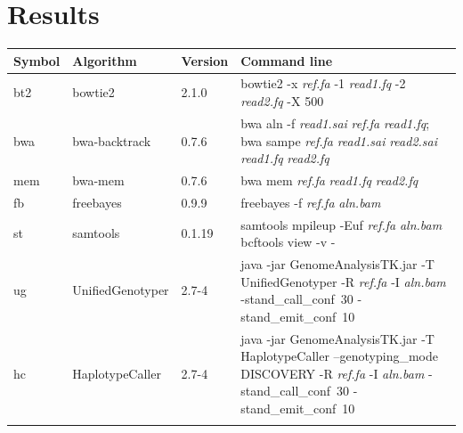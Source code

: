 \documentclass{bioinfo}
\begin{document}

\title{}

\author[Li]{Heng Li}

\address{Broad Institute of Harvard and MIT, 7 Cambridge Center, Cambridge, MA 02142, USA}

\maketitle

\begin{abstract}
\end{abstract}

\section{Results}

\begin{table}
\footnotesize
{}
{\begin{tabular*}{\textwidth}{@{\extracolsep{\fill}}lllp{12cm}}
\toprule
Symbol & Algorithm & Version & Command line \\
\midrule
bt2 & bowtie2 & 2.1.0 & bowtie2 -x \emph{ref.fa} -1 \emph{read1.fq} -2 \emph{read2.fq} -X 500 \\
bwa & bwa-backtrack & 0.7.6 & bwa aln -f \emph{read1.sai} \emph{ref.fa} \emph{read1.fq}; bwa sampe \emph{ref.fa} \emph{read1.sai} \emph{read2.sai} \emph{read1.fq} \emph{read2.fq} \\
mem & bwa-mem & 0.7.6 & bwa mem \emph{ref.fa} \emph{read1.fq} \emph{read2.fq} \\
fb & freebayes & 0.9.9 & freebayes -f \emph{ref.fa} \emph{aln.bam} \\
st & samtools & 0.1.19 & samtools mpileup -Euf \emph{ref.fa} \emph{aln.bam} {\tt \char124} bcftools view -v - \\
ug & UnifiedGenotyper & 2.7-4 & java -jar GenomeAnalysisTK.jar -T UnifiedGenotyper -R \emph{ref.fa} -I \emph{aln.bam} \mbox{-stand\_call\_conf 30} \mbox{-stand\_emit\_conf 10} \\
hc & HaplotypeCaller & 2.7-4 & java -jar GenomeAnalysisTK.jar -T HaplotypeCaller --genotyping\_mode DISCOVERY -R \emph{ref.fa} -I \emph{aln.bam} \mbox{-stand\_call\_conf 30} \mbox{-stand\_emit\_conf 10} \\
\botrule
\end{tabular*}}{}
\end{table}
\end{document}
